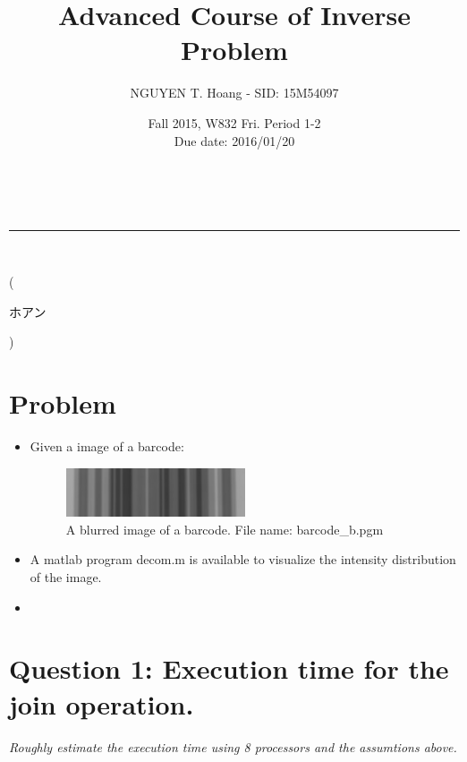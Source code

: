 \documentclass[a4paper,12pt]{article}
\makeatletter
\newcommand{\linia}{\rule{\linewidth}{0.5pt}}
\renewcommand{\maketitle} {
\begin{center}
\vspace{2ex}
{\LARGE \textsc{\@title}}
\vspace{1ex}
\\
\linia\\
\@author \hfill \@date
\vspace{4ex}
\end{center}
}
\makeatother
\begin{document}
\title{Advanced Course of Inverse Problem}

\author{NGUYEN T. Hoang - SID: 15M54097}

\date{Fall 2015, W832 Fri. Period 1-2 \\ \hfill Due date: 2016/01/20}

\maketitle
\vspace{-4.5em}
\hspace{5.3em} (\begin{CJK}{UTF8}{min}ホアン\end{CJK})
\vspace{4em}
\section*{Problem}
\begin{itemize}
	\item Given a image of a barcode:
	\begin{figure}[h]
		\centering
		\includegraphics[width=0.5\textwidth]{barcode_b.jpg}
		\caption{A blurred image of a barcode. File name: \textsf{barcode_b.pgm}}
		\label{fig:blurbar}
	\end{figure}
    \item A matlab program \textsf{decom.m} is available to visualize the intensity distribution of the image.
	\item 
\end{itemize}
\vspace{4em}
\section*{Question 1: Execution time for the join operation.}
\setcounter{section}{1}

\textit{Roughly estimate the execution time using 8 processors and the assumtions above.} 
\end{document}

